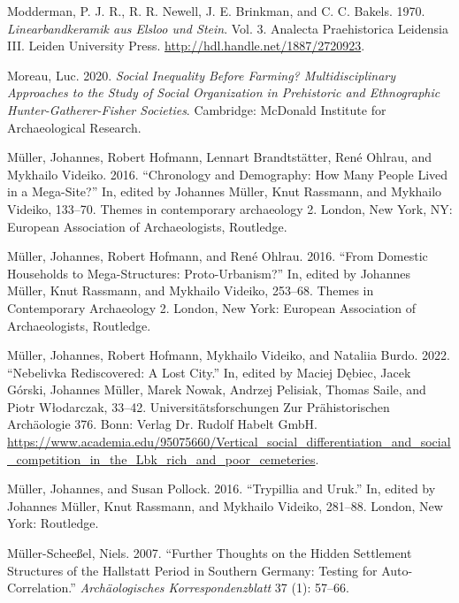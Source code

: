 \documentclass[
  12pt,
  a4paper, twoside]{book}
\newlength{\cslhangindent}
\newlength{\cslentryspacingunit} %
\newenvironment{CSLReferences}[2] %
 {%
  \setlength{\parindent}{0pt}
  \ifodd #1
  \let\oldpar\par
  \def\par{\hangindent=\cslhangindent\oldpar}
  \fi
  \setlength{\parskip}{#2\cslentryspacingunit}
 }%
 {}
\begin{document}
\begin{CSLReferences}{1}{0}
\leavevmode{}%
Modderman, P. J. R., R. R. Newell, J. E. Brinkman, and C. C. Bakels. 1970. \emph{Linearbandkeramik aus Elsloo und Stein}. Vol. 3. Analecta Praehistorica Leidensia III. Leiden University Press. \url{http://hdl.handle.net/1887/2720923}.

\leavevmode{}%
Moreau, Luc. 2020. \emph{Social Inequality Before Farming? Multidisciplinary Approaches to the Study of Social Organization in Prehistoric and Ethnographic Hunter-Gatherer-Fisher Societies}. Cambridge: McDonald Institute for Archaeological Research.

\leavevmode{}%
Müller, Johannes, Robert Hofmann, Lennart Brandtstätter, René Ohlrau, and Mykhailo Videiko. 2016. {``Chronology and Demography: How Many People Lived in a Mega-Site?''} In, edited by Johannes Müller, Knut Rassmann, and Mykhailo Videiko, 133--70. Themes in contemporary archaeology 2. London, New York, NY: European Association of Archaeologists, Routledge.

\leavevmode{}%
Müller, Johannes, Robert Hofmann, and René Ohlrau. 2016. {``From Domestic Households to Mega-Structures: Proto-Urbanism?''} In, edited by Johannes Müller, Knut Rassmann, and Mykhailo Videiko, 253--68. Themes in Contemporary Archaeology 2. London, New York: European Association of Archaeologists, Routledge.

\leavevmode{}%
Müller, Johannes, Robert Hofmann, Mykhailo Videiko, and Nataliia Burdo. 2022. {``Nebelivka {\textendash} Rediscovered: A Lost City.''} In, edited by Maciej Dębiec, Jacek Górski, Johannes Müller, Marek Nowak, Andrzej Pelisiak, Thomas Saile, and Piotr Włodarczak, 33--42. Universitätsforschungen Zur Prähistorischen Archäologie 376. Bonn: Verlag Dr. Rudolf Habelt GmbH. \url{https://www.academia.edu/95075660/Vertical_social_differentiation_and_social_competition_in_the_Lbk_rich_and_poor_cemeteries}.

\leavevmode{}%
Müller, Johannes, and Susan Pollock. 2016. {``Trypillia and Uruk.''} In, edited by Johannes Müller, Knut Rassmann, and Mykhailo Videiko, 281--88. London, New York: Routledge.

\leavevmode{}%
Müller-Scheeßel, Niels. 2007. {``Further Thoughts on the Hidden Settlement Structures of the Hallstatt Period in Southern Germany: Testing for Auto-Correlation.''} \emph{Archäologisches Korrespondenzblatt} 37 (1): 57--66.


\end{CSLReferences}
\end{document}
